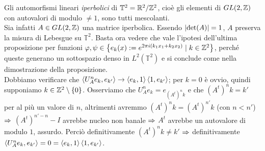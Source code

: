 \begin{esempio}Gli automorfismi lineari \emph{iperbolici} di $\mathbb{T}^2=\mathbb{R}^2/\mathbb{Z}^2$, cioè
gli elementi di $GL(2,\mathbb{Z})$ con autovalori di modulo $\neq 1$, sono tutti mescolanti. \\
Sia infatti $A\in GL(2,\mathbb{Z})$ una matrice iperbolica. Essendo $\left|\det(A)\right|=1$, $A$ preserva la misura di Lebesgue su $\mathbb{T}^2$.
Basta ora vedere che vale l'ipotesi dell'ultima proposizione per funzioni
$\varphi,\psi\in\left\{e_k(x):=e^{2\pi i(k_1 x_1+k_2 x_2)}\mid k\in\mathbb{Z}^2\right\}$, perché queste generano un sottospazio denso in $L^2(\mathbb{T}^2)$
e si conclude come nella dimostrazione della proposizione. \\
Dobbiamo verificare che $\left\langle U_A^n e_k,e_{k'}\right\rangle\to\left\langle e_k,1\right\rangle\left\langle1,e_{k'}\right\rangle$; per $k=0$ è ovvio, quindi supponiamo $k\in\mathbb{Z}^2\setminus\left\{0\right\}$.
Osserviamo che $U_A^n e_k=e_{(A^t)^n k}$ e che $(A^t)^n k=k'$ per al più un valore di $n$,
altrimenti avremmo $(A^t)^n k=(A^t)^{n'} k$ (con $n<n'$) $\Rightarrow$ $(A^t)^{n'-n}-I$ avrebbe nucleo non banale
$\Rightarrow$ $A^t$ avrebbe un autovalore di modulo $1$, assurdo.
Perciò definitivamente $(A^t)^n k\neq k'$ $\Rightarrow$ definitivamente $\left\langle U_A^n e_k,e_{k'}\right\rangle=0=\left\langle e_k,1\right\rangle\left\langle1,e_{k'}\right\rangle$.
\end{esempio}